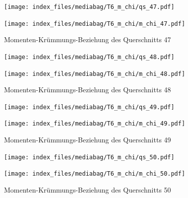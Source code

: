 \documentclass[
  11pt,
  letterpaper,
]{scrreprt}
\begin{document}
\begin{figure}[H]

\begin{minipage}{0.50\linewidth}
\texttt{[image: index\_files/mediabag/T6\_m\_chi/qs\_47.pdf]}\end{minipage}%
%
\begin{minipage}{0.50\linewidth}
\texttt{[image: index\_files/mediabag/T6\_m\_chi/m\_chi\_47.pdf]}\end{minipage}%

\caption{\label{fig-mchi_anhang}Momenten-Krümmungs-Beziehung des
Querschnitts 47}

\end{figure}%

\begin{figure}[H]

\begin{minipage}{0.50\linewidth}
\texttt{[image: index\_files/mediabag/T6\_m\_chi/qs\_48.pdf]}\end{minipage}%
%
\begin{minipage}{0.50\linewidth}
\texttt{[image: index\_files/mediabag/T6\_m\_chi/m\_chi\_48.pdf]}\end{minipage}%

\caption{\label{fig-mchi_anhang}Momenten-Krümmungs-Beziehung des
Querschnitts 48}

\end{figure}%

\begin{figure}[H]

\begin{minipage}{0.50\linewidth}
\texttt{[image: index\_files/mediabag/T6\_m\_chi/qs\_49.pdf]}\end{minipage}%
%
\begin{minipage}{0.50\linewidth}
\texttt{[image: index\_files/mediabag/T6\_m\_chi/m\_chi\_49.pdf]}\end{minipage}%

\caption{\label{fig-mchi_anhang}Momenten-Krümmungs-Beziehung des
Querschnitts 49}

\end{figure}%

\begin{figure}[H]

\begin{minipage}{0.50\linewidth}
\texttt{[image: index\_files/mediabag/T6\_m\_chi/qs\_50.pdf]}\end{minipage}%
%
\begin{minipage}{0.50\linewidth}
\texttt{[image: index\_files/mediabag/T6\_m\_chi/m\_chi\_50.pdf]}\end{minipage}%

\caption{\label{fig-mchi_anhang}Momenten-Krümmungs-Beziehung des
Querschnitts 50}

\end{figure}%
\end{document}

